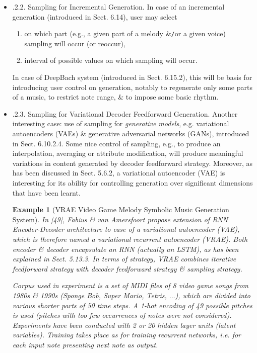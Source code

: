 \documentclass{article}
\newtheorem{example}{Example}
\begin{document}
\begin{itemize}
\begin{itemize}
\begin{itemize}
\begin{itemize}
				This technique will be further generalized \& combined with conditioning strategy in order to control generation of notes at specific positions via positional constraints. This will be exemplified by Anticipation-RNN system to be introduced in Sect. 6.10.3.5.
				\item {.2.2. Sampling for Incremental Generation.} In case of an incremental generation (introduced in Sect. 6.14), user may select
				\begin{enumerate}
					\item on which part (e.g., a given part of a melody \&{\tt/}or a given voice) sampling will occur (or reoccur),
					\item interval of possible values on which sampling will occur.
				\end{enumerate}
				In case of DeepBach system (introduced in Sect. 6.15.2), this will be basis for introducing user control on generation, notably to regenerate only some parts of a music, to restrict note range, \& to impose some basic rhythm.
				\item {.2.3. Sampling for Variational Decoder Feedforward Generation.} Another interesting case: use of sampling for {\it generative models}, e.g. variational autoencoders (VAEs) \& generative adversarial networks (GANs), introduced in Sect. 6.10.2.4. Some nice control of sampling, e.g., to produce an interpolation, averaging or attribute modification, will produce meaningful variations in content generated by decoder feedforward strategy. Moreover, as has been discussed in Sect. 5.6.2, a variational autoencoder (VAE) is interesting for its ability for controlling generation over significant dimensions that have been learnt.
				\begin{example}[VRAE Video Game Melody Symbolic Music Generation System]
					In [49], {\sc Fabius \& van Amersfoort} propose extension of RNN Encoder-Decoder architecture to case of a variational autoencoder (VAE), which is therefore named a variational recurrent autoencoder (VRAE). Both encoder \& decoder encapsulate an RNN (actually an LSTM), as has been explained in Sect. 5.13.3. In terms of strategy, VRAE combines iterative feedforward strategy with decoder feedforward strategy \& sampling strategy.

					Corpus used in experiment is a set of MIDI files of 8 video game songs from 1980s \& 1990s (Sponge Bob, Super Mario, Tetris, $\ldots$), which are divided into various shorter parts of 50 time steps. A 1-hot encoding of 49 possible pitches is used (pitches with too few occurrences of notes were not considered). Experiments have been conducted with 2 or 20 hidden layer units (latent variables). Training takes place as for training recurrent networks, i.e. for each input note presenting next note as output.


\end{example}
\end{itemize}
\end{itemize}
\end{itemize}
\end{itemize}
\end{document}
